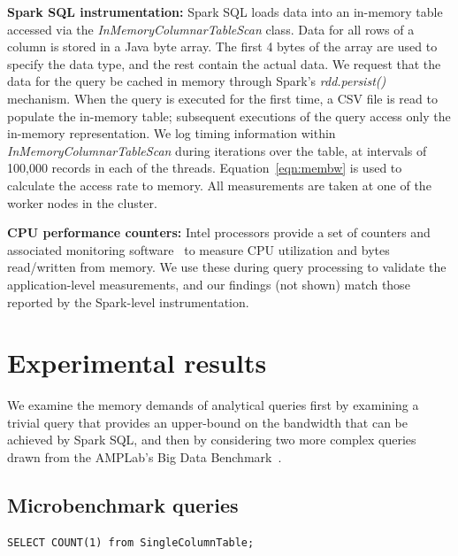 \documentclass{sig-alternate-05-2015}
\renewcommand{\paragraph}[1]{{\bf #1}}
\begin{document}
\paragraph{Spark SQL instrumentation:} Spark SQL loads data into an in-memory
table accessed via the {\it InMemoryColumnarTableScan} class. Data for all rows
of a column is stored in a Java byte array. The first 4 bytes of the array are
used to specify the data type, and the rest contain the actual data.  We
request that the data for the query be cached in memory through Spark's {\it
rdd.persist()} mechanism.  When the query is executed for the first time, a CSV
file is read to populate the in-memory table; subsequent executions of the
query access only the in-memory representation.  We log timing information
within {\it InMemoryColumnarTableScan} during iterations over the table, at
intervals of 100,000 records in each of the threads. Equation~\ref{eqn:membw}
is used to calculate the access rate to memory.  All measurements are taken at
one of the worker nodes in the cluster.

\paragraph{CPU performance counters:} Intel processors provide a set of
counters and associated monitoring software~\cite{intelPerf} to measure CPU
utilization and bytes read/written from memory.  We use these during query
processing to validate the application-level measurements, and our findings
(not shown) match those reported by the Spark-level instrumentation.

\section{Experimental results}

We examine the memory demands of analytical queries first by examining a
trivial query that provides an upper-bound on the bandwidth that can be
achieved by Spark SQL, and then by considering two more complex queries drawn
from the AMPLab's Big Data Benchmark~\cite{amplab_benchmark}.

\subsection{Microbenchmark queries}

\begin{Verbatim}[frame=single,label=Query 1]
SELECT COUNT(1) from SingleColumnTable;
\end{Verbatim}
\end{document}
